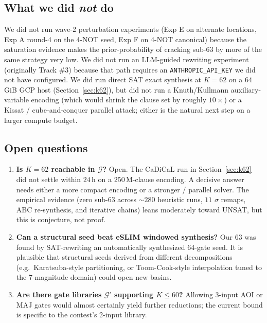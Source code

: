 \documentclass[11pt]{article}
\begin{document}
\subsection{What we did \emph{not} do}

We did not run wave-2 perturbation experiments
(Exp E on alternate locations, Exp A round-4 on the 4-NOT seed,
Exp F on 4-NOT canonical) because the saturation evidence makes
the prior-probability of cracking sub-63 by more of the same
strategy very low.
We did not run an LLM-guided rewriting experiment (originally
Track \#3) because that path requires an
\texttt{ANTHROPIC\_API\_KEY} we did not have configured.
We did run direct SAT exact synthesis at $K{=}62$ on a $64$\,GiB
GCP host (Section~\ref{sec:k62}), but did not run a Knuth/Kullmann
auxiliary-variable encoding (which would shrink the clause set by
roughly $10\times$) or a Kissat / cube-and-conquer parallel attack;
either is the natural next step on a larger compute budget.

\subsection{Open questions}

\begin{enumerate}
  \item \textbf{Is $K = 62$ reachable in $\mathcal{G}$?}
        Open. The CaDiCaL run in Section~\ref{sec:k62} did not
        settle within $24$\,h on a $250$\,M-clause encoding. A
        decisive answer needs either a more compact encoding or a
        stronger / parallel solver. The empirical evidence (zero
        sub-63 across $\sim$$280$ heuristic runs, $11$ $\sigma$
        remaps, ABC re-synthesis, and iterative chains) leans
        moderately toward UNSAT, but this is conjecture, not proof.
  \item \textbf{Can a structural seed beat eSLIM windowed
        synthesis?}
        Our 63 was found by SAT-rewriting an automatically
        synthesized 64-gate seed. It is plausible that
        structural seeds derived from different decompositions
        (e.g.\ Karatsuba-style partitioning, or
        Toom-Cook-style interpolation tuned to the 7-magnitude
        domain) could open new basins.
  \item \textbf{Are there gate libraries
        $\mathcal{G}'$ supporting $K \le 60$?}
        Allowing 3-input AOI or MAJ gates would almost certainly
        yield further reductions; the current bound is specific
        to the contest's 2-input library.
\end{enumerate}
\end{document}

